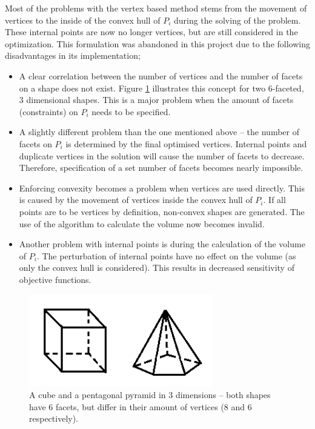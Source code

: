 Most of the problems with the vertex based method stems from the movement of vertices to the inside of the convex hull of $P_i$ during the solving of the problem.
These internal points are now no longer vertices, but are still considered in the optimization.
This formulation was abandoned in this project due to the following disadvantages in its implementation;
\begin{itemize}
  \item A clear correlation between the number of vertices and the number of facets on a shape does not exist.
Figure \ref{fig:vertsvsfaces} illustrates this concept for two 6-faceted, 3 dimensional shapes.
This is a major problem when the amount of facets (constraints) on $P_i$ needs to be specified.
  \item A slightly different problem than the one mentioned above -- the number of facets on $P_i$ is determined by the final optimised vertices.
Internal points and duplicate vertices in the solution will cause the number of facets to decrease.
Therefore, specification of a set number of facets becomes nearly impossible.
  \item Enforcing convexity becomes a problem when vertices are used directly.
This is caused by the movement of vertices inside the convex hull of $P_i$.
If all points are to be vertices by definition, non-convex shapes are generated.
The use of the \qhull algorithm to calculate the volume now becomes invalid. 
  \item Another problem with internal points is during the calculation of the volume of $P_i$.
The perturbation of internal points have no effect on the volume (as only the convex hull is considered).
This results in decreased sensitivity of objective functions.
\end{itemize}

\begin{figure}[htbp]
  \centering
  \includegraphics[width=8cm]{graph/vertsvsfaces}
  \caption[The unclear correlation between number of facets and vertices]{A cube and a pentagonal pyramid in 3 dimensions -- both shapes have 6 facets, but differ in their amount of vertices (8 and 6  respectively).}
  \label{fig:vertsvsfaces}
\end{figure}

